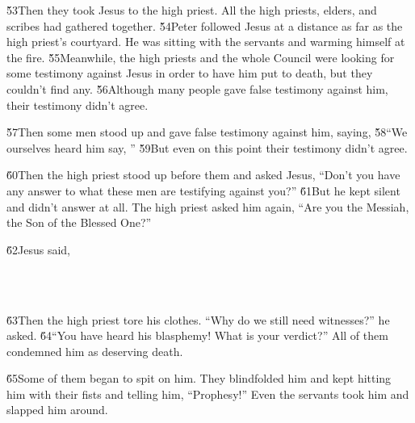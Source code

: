 \v{53}Then they took Jesus to the high priest. All the high priests, elders, and scribes had gathered together. \v{54}Peter followed Jesus at a distance as far as the high priest's courtyard. He was sitting with the servants and warming himself at the fire. \v{55}Meanwhile, the high priests and the whole Council were looking for some testimony against Jesus in order to have him put to death, but they couldn't find any. \v{56}Although many people gave false testimony against him, their testimony didn't agree.

\v{57}Then some men stood up and gave false testimony against him, saying, \v{58}``We ourselves heard him say, '' \v{59}But even on this point their testimony didn't agree.

\v{60}Then the high priest stood up before them and asked Jesus, ``Don't you have any answer to what these men are testifying against you?'' \v{61}But he kept silent and didn't answer at all. The high priest asked him again, ``Are you the Messiah, the Son of the Blessed One?''

\v{62}Jesus said, 

\begin{poetry}
\poeml {} \\
\poemll    {} \\
\poemlll       {}
\end{poetry}

\v{63}Then the high priest tore his clothes. ``Why do we still need witnesses?'' he asked. \v{64}``You have heard his blasphemy! What is your verdict?'' All of them condemned him as deserving death.

\v{65}Some of them began to spit on him. They blindfolded him and kept hitting him with their fists and telling him, ``Prophesy!'' Even the servants took him and slapped him around.

